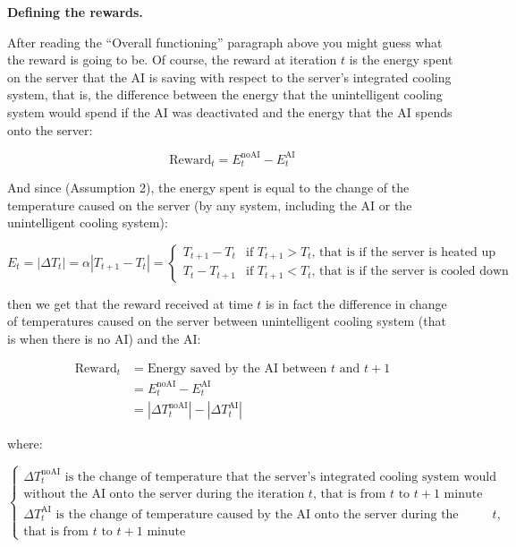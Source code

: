 \documentclass[]{book}
\begin{document}
\textbf{Defining the rewards.}

After reading the ``Overall functioning'' paragraph above you might guess what the reward is going to be. Of course, the reward at iteration \(t\) is the energy spent on the server that the AI is saving with respect to the server's integrated cooling system, that is, the difference between the energy that the unintelligent cooling system would spend if the AI was deactivated and the energy that the AI spends onto the server:

\begin{equation*}
    \textrm{Reward}_t = E_t^{\textrm{noAI}} - E_t^{\textrm{AI}}
\end{equation*}

And since (Assumption 2), the energy spent is equal to the change of the temperature caused on the server (by any system, including the AI or the unintelligent cooling system):

\begin{equation*}
E_t = |\Delta T_t| = \alpha |T_{t+1} - T_t| =
\begin{cases}
T_{t+1} - T_t & \textrm{if $T_{t+1} > T_t$, that is if the server is heated up} \\
T_t - T_{t+1} & \textrm{if $T_{t+1} < T_t$, that is if the server is cooled down}
\end{cases}
\end{equation*}

then we get that the reward received at time \(t\) is in fact the difference in change of temperatures caused on the server between unintelligent cooling system (that is when there is no AI) and the AI:

\begin{align*}
    \textrm{Reward}_t
    & = \textrm{Energy saved by the AI between $t$ and $t+1$} \\
    & = E_t^{\textrm{noAI}} - E_t^{\textrm{AI}} \\
    & = |\Delta T_t^{\textrm{noAI}}| - |\Delta T_t^{\textrm{AI}}|
\end{align*}

where:

\begin{equation*}
\begin{cases}
\textrm{$\Delta T_t^{\textrm{noAI}}$ is the change of temperature that the server's integrated cooling system would cause} \\
\textrm{without the AI onto the server during the iteration $t$, that is from $t$ to $t+1$ minute} \\
\textrm{$\Delta T_t^{\textrm{AI}}$ is the change of temperature caused by the AI onto the server during the iteration $t$,} \\
\textrm{that is from $t$ to $t+1$ minute}
\end{cases}
\end{equation*}
\end{document}
